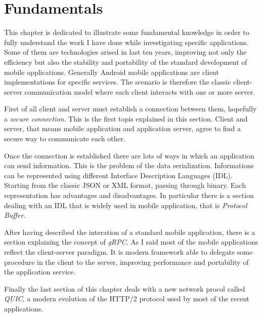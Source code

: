 \chapter{Fundamentals}
	\par This chapter is dedicated to illustrate some fundamental knowledge in order to fully understand the work I have done while investigating specific applications. Some of them are technologies arised in last ten years, improving not only the efficiency but also the stability and portability of the standard development of mobile applications. \newline
	Generally Android mobile applications are client implementations for specific services. The scenario is therefore the classic client-server communication model where each client interacts with one or more server. \newline
	\par First of all client and server must establish a connection between them, hopefully a \textit{secure connection}. This is the first topis explained in this section. Client and server, that means mobile application and application server, agree to find a secure way to communicate each other. 
	\par Once the connection is established there are lots of ways in which an application can send information. This is the problem of the data serialization. Informations can be represented using different Interface Description Languages (IDL). Starting from the classic JSON or XML format, passing through binary. Each representation has advantages and disadvantages. In particular there is a section dealing with an IDL that is widely used in mobile application, that is \textit{Protocol Buffer}.
	\par After having described the interation of a standard mobile application, there is a section explaining the concept of \textit{gRPC}. As I said most of the mobile applications reflect the client-server paradigm. It is modern framework able to delegate some procedure in the client to the server, improving performance and portability of the application service.
	\par Finally the last section of this chapter deals with a new network procol called \textit{QUIC}, a modern evolution of the HTTP/2 protocol used by most of the recent applications.
	
